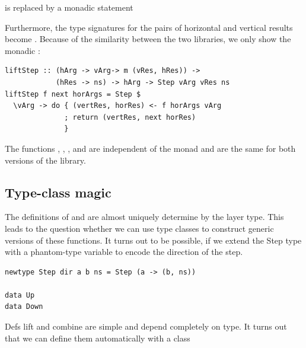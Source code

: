 \documentclass[preprint,natbib]{sigplanconf}
\begin{document}

is replaced by a monadic statement


Furthermore, the type signatures for the pairs of horizontal and vertical results  become . Because of the similarity between the two libraries, we only show the monadic :

\begin{small}
\begin{verbatim}
liftStep :: (hArg -> vArg-> m (vRes, hRes)) -> 
            (hRes -> ns) -> hArg -> Step vArg vRes ns
liftStep f next horArgs = Step $ 
  \vArg -> do { (vertRes, horRes) <- f horArgs vArg
              ; return (vertRes, next horRes)
              }
\end{verbatim}
\end{small}%

The functions , , , and  are independent of the monad and are the same for both versions of the library. 



%																
%																
%																
\subsection{Type-class magic} \label{sect:typeClass}

The definitions of  and  are almost uniquely determine by the layer type. This leads to the question whether we can use type classes to construct generic versions of these functions. It turns out to be possible, if we extend the Step type with a phantom-type variable to encode the direction of the step. 

\begin{small}
\begin{verbatim}
newtype Step dir a b ns = Step (a -> (b, ns))

data Up 
data Down 
\end{verbatim}
\end{small}

Defs lift and combine are simple and depend completely on type. It turns out that we can define them automatically with a class

\end{document}
